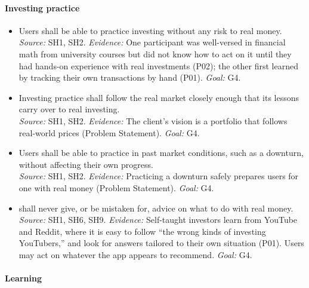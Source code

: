 \documentclass[12pt]{article}
\newcounter{srnum} %
\begin{document}
\paragraph{Investing practice}

{\sloppy
  \noindent\begin{itemize}
    \item[SR\refstepcounter{srnum}\thesrnum\label{SR_RiskFree}:] Users shall be able to practice investing without any risk to real money.\\
          \emph{Source:} SH1, SH2. \emph{Evidence:} One participant was well-versed in financial math from university courses but did not know how to act on it until they had hands-on experience with real investments (P02); the other first learned by tracking their own transactions by hand (P01). \emph{Goal:} G4.
    \item[SR\refstepcounter{srnum}\thesrnum\label{SR_RealMarket}:] Investing practice shall follow the real market closely enough that its lessons carry over to real investing.\\
          \emph{Source:} SH1, SH2. \emph{Evidence:} The client's vision is a portfolio that follows real-world prices (Problem Statement). \emph{Goal:} G4.
    \item[SR\refstepcounter{srnum}\thesrnum\label{SR_PastMarkets}:] Users shall be able to practice in past market conditions, such as a downturn, without affecting their own progress.\\
          \emph{Source:} SH1, SH2. \emph{Evidence:} Practicing a downturn safely prepares users for one with real money (Problem Statement). \emph{Goal:} G4.
    \item[SR\refstepcounter{srnum}\thesrnum\label{SR_NotAdvice}:] \progname{} shall never give, or be mistaken for, advice on what to do with real money.\\
          \emph{Source:} SH1, SH6, SH9. \emph{Evidence:} Self-taught investors learn from YouTube and Reddit, where it is easy to follow ``the wrong kinds of investing YouTubers,'' and look for answers tailored to their own situation (P01). Users may act on whatever the app appears to recommend. \emph{Goal:} G4.
  \end{itemize}
  \par}

\paragraph{Learning}
\end{document}
